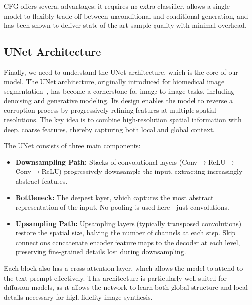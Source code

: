 \documentclass[11pt,a4paper]{article}
\begin{document}
CFG offers several advantages: it requires no extra classifier, allows a single model to flexibly trade off between unconditional and conditional generation, and has been shown to deliver state‐of‐the‐art sample quality with minimal overhead.

\newpage



\subsection{UNet Architecture}
Finally, we need to understand the UNet architecture, which is the core of our model. The UNet architecture, originally introduced for biomedical image segmentation~\cite{ronneberger2015u}, has become a cornerstone for image-to-image tasks, including denoising and generative modeling. Its design enables the model to reverse a corruption process by progressively refining features at multiple spatial resolutions. The key idea is to combine high-resolution spatial information with deep, coarse features, thereby capturing both local and global context.

The UNet consists of three main components:
\begin{itemize}
    \item \textbf{Downsampling Path:} Stacks of convolutional layers (Conv$\rightarrow$ReLU$\rightarrow$Conv$\rightarrow$ReLU) progressively downsample the input, extracting increasingly abstract features.
    \item \textbf{Bottleneck:} The deepest layer, which captures the most abstract representation of the input. No pooling is used here—just convolutions.
    \item \textbf{Upsampling Path:} Upsampling layers (typically transposed convolutions) restore the spatial size, halving the number of channels at each step. Skip connections concatenate encoder feature maps to the decoder at each level, preserving fine-grained details lost during downsampling.
\end{itemize}

Each block also has a cross-attention layer, which allows the model to attend to the text prompt effectively. This architecture is particularly well-suited for diffusion models, as it allows the network to learn both global structure and local details necessary for high-fidelity image synthesis.
\end{document}
